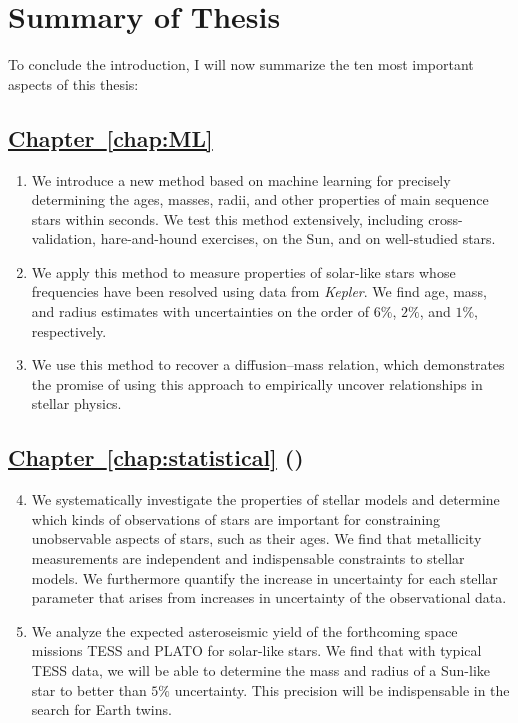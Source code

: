 \newpage
\section{Summary of Thesis}
To conclude the introduction, I will now summarize the ten most important aspects of this thesis: 

\subsection*{\hspace*{0.5cm}\hyperref[chap:ML]{Chapter~\ref{chap:ML}} \citep{2016apj...830...31b}}
\begin{enumerate}
    \item We introduce a new method based on machine learning for precisely determining the ages, masses, radii, and other properties of main sequence stars within seconds. 
    We test this method extensively, including cross-validation, hare-and-hound exercises, on the Sun, and on well-studied stars. 
    \item We apply this method to measure properties of solar-like stars whose frequencies have been resolved using data from \emph{Kepler}. 
    We find age, mass, and radius estimates with uncertainties on the order of $6\%$, $2\%$, and $1\%$, respectively. 
    \item We use this method to recover a diffusion--mass relation, which demonstrates the promise of using this approach to empirically uncover relationships in stellar physics. %
\end{enumerate}

\subsection*{\hspace*{0.5cm}\hyperref[chap:statistical]{Chapter~\ref{chap:statistical}} ()}
\begin{enumerate}
    \setcounter{enumi}{3}
    \item We systematically investigate the properties of stellar models and determine which kinds of observations of stars are important for constraining unobservable aspects of stars, such as their ages. 
    We find that metallicity measurements are independent and indispensable constraints to stellar models. 
    We furthermore quantify the increase in uncertainty for each stellar parameter that arises from increases in uncertainty of the observational data. 
    \item We analyze the expected asteroseismic yield of the forthcoming space missions TESS and PLATO for solar-like stars. 
    We find that with typical TESS data, we will be able to determine the mass and radius of a Sun-like star to better than $5\%$ uncertainty. 
    This precision will be indispensable in the search for Earth twins. 
\end{enumerate}

